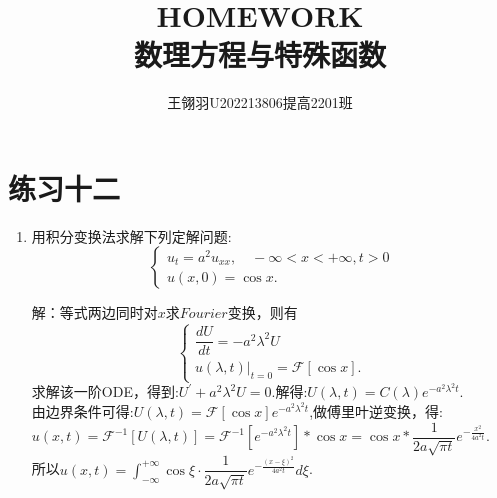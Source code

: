 \documentclass[11pt]{article}
\begin{document}
\title{\vspace{-2cm}HOMEWORK\\ 数理方程与特殊函数}
\author{王翎羽\quad U202213806\quad 提高2201班}
\maketitle

\section*{练习十二}
\begin{enumerate}
    \item 用积分变换法求解下列定解问题:
     \begin{equation*}
        \left\{
         \begin{array}{lr}
         u_{t}=a^2u_{xx},\quad -\infty <x < +\infty, t>0\\u(x,0)=\cos x.
         \end{array}
        \right.
     \end{equation*}

    解：等式两边同时对$x$求$Fourier$变换，则有
    \begin{equation*}
        \left\{
         \begin{array}{lr}
         \dfrac{dU}{dt}=-a^2\lambda^{2}U\\u(\lambda,t)|_{t=0}=\mathscr{F}[\cos x].
         \end{array}
        \right.
     \end{equation*}
    求解该一阶ODE，得到:$U^{'}+a^2\lambda^{2}U=0$.解得:$U(\lambda,t)=C(\lambda)e^{-a^2 \lambda^2 t}$.\\由边界条件可得:$U(\lambda,t)=\mathscr{F}[\cos x]e^{-a^2 \lambda^2 t}$,做傅里叶逆变换，得:
    \\$u(x,t)=\mathscr{F}^{-1}[U(\lambda,t)]=\mathscr{F}^{-1}[e^{-a^2 \lambda^2 t}]\ast \cos x=\cos x \ast\dfrac{1}{2a\sqrt {\pi t}}e^{-\frac{x^2}{4a^2 t}}$.\\所以$u(x,t)=\displaystyle\int_{-\infty}^{+\infty}\cos \xi \cdot \dfrac{1}{2a\sqrt {\pi t}}e^{-\frac{(x-\xi)^2}{4a^2 t}}d\xi$.


\end{enumerate}
\end{document}
